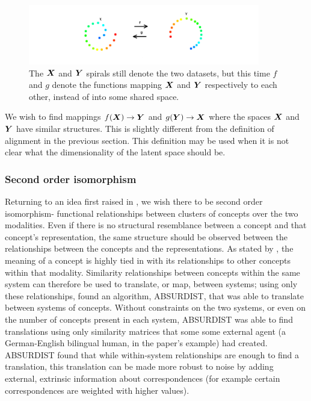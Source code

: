 \begin{figure}[H]
\label{fig:alignment2}
    \centering
    \includegraphics[width=0.9\textwidth]{images/review/alignment2.png}
    \caption{
        The $\boldsymbol{X}$ and $\boldsymbol{Y}$ spirals still denote the two datasets, but this time $f$ and $g$ denote the functions mapping $\boldsymbol{X}$ and $\boldsymbol{Y}$ respectively to each other, instead of into some shared space.
    }
\end{figure}

We wish to find mappings $f(\boldsymbol{X}) \rightarrow \boldsymbol{Y}$ and $g(\boldsymbol{Y}) \rightarrow \boldsymbol{X}$ where the spaces $\boldsymbol{X}$ and $\boldsymbol{Y}$  have similar structures. This is slightly different from the definition of alignment in the previous section. This definition may be used when it is not clear what the dimensionality of the latent space should be. 

\subsubsection{Second order isomorphism}

Returning to an idea first raised in \cite{SHEPARD19701}, we wish there to be second order isomorphism- functional relationships between clusters of concepts over the two modalities. Even if there is no structural resemblance between a concept and that concept's representation, the same structure should be observed between the relationships between the concepts  and the representations. As stated by \cite{GOLDSTONE2002295}, the meaning of a concept is highly tied in with its relationships to other concepts within that modality. Similarity relationships between concepts within the same system can therefore be used to translate, or map, between systems; using only these relationships, \cite{GOLDSTONE2002295} found an algorithm, ABSURDIST, that was able to translate between systems of concepts. Without constraints on the two systems, or even on the number of concepts present in each system, ABSURDIST was able to find translations using only similarity matrices that some some external agent (a German-English bilingual human, in the paper's example) had created. ABSURDIST found that while within-system relationships are enough to find a translation, this translation can be made more robust to noise by adding external, extrinsic information about correspondences (for example certain correspondences are weighted with higher values). 

